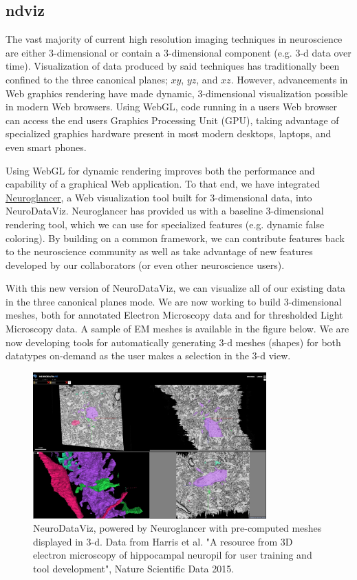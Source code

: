 \documentclass[simplex.tex]{subfiles}
\begin{document}
\subsection{ndviz}

The vast majority of current high resolution imaging techniques in neuroscience are either 3-dimensional or contain a 3-dimensional component (e.g. 3-d data over time). Visualization of data produced by said techniques has traditionally been confined to the three canonical planes; $xy$, $yz$, and $xz$. However, advancements in Web graphics rendering have made dynamic, 3-dimensional visualization possible in modern Web browsers. Using WebGL, code running in a users Web browser can access the end users Graphics Processing Unit (GPU), taking advantage of specialized graphics hardware present in most modern desktops, laptops, and even smart phones. 

Using WebGL for dynamic rendering improves both the performance and capability of a graphical Web application. To that end, we have integrated \href{https://github.com/google/neuroglancer}{Neuroglancer}, a Web visualization tool built for 3-dimensional data, into NeuroDataViz. Neuroglancer has provided us with a baseline 3-dimensional rendering tool, which we can use for specialized features (e.g. dynamic false coloring). By building on a common framework, we can contribute features back to the neuroscience community as well as take advantage of new features developed by our collaborators (or even other neuroscience users). 

With this new version of NeuroDataViz, we can visualize all of our existing data in the three canonical planes mode. We are now working to build 3-dimensional meshes, both for annotated Electron Microscopy data and for thresholded Light Microscopy data. A sample of EM meshes is available in the figure below. We are now developing tools for automatically generating 3-d meshes (shapes) for both datatypes on-demand as the user makes a selection in the 3-d view.  


\begin{figure}[!h]
\begin{cframed}
\centering
\includegraphics[width=0.8\textwidth]{../../figs/ndviz3d_fig.jpg}
\caption{NeuroDataViz, powered by Neuroglancer with pre-computed meshes displayed in 3-d. Data from Harris et al. "A resource from 3D electron microscopy of hippocampal neuropil for user training and tool development", Nature Scientific Data 2015.}
\label{fig:name}
\end{cframed}
\end{figure}

\clearpage
\end{document}
